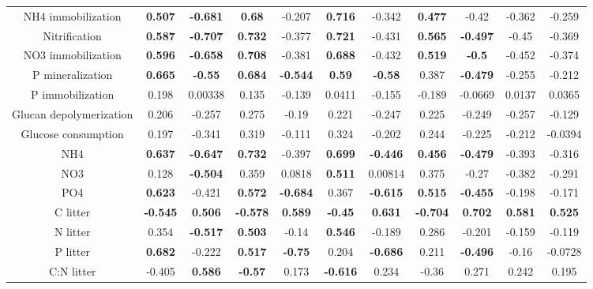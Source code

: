 \documentclass[authoryear,preprint,review,12pt]{elsarticle}
\begin{document}
\begin{table}[h!]
\begin{center}
{\begin{tabular}{ccccccccccc}
  NH4 immobilization & \textbf{ 0.507 } & \textbf{ -0.681 } & \textbf{ 0.68 } & -0.207 & \textbf{ 0.716 } & -0.342 & \textbf{ 0.477 } & -0.42 & -0.362 & -0.259 \\ 
  Nitrification & \textbf{ 0.587 } & \textbf{ -0.707 } & \textbf{ 0.732 } & -0.377 & \textbf{ 0.721 } & -0.431 & \textbf{ 0.565 } & \textbf{ -0.497 } & -0.45 & -0.369 \\ 
  NO3 immobilization & \textbf{ 0.596 } & \textbf{ -0.658 } & \textbf{ 0.708 } & -0.381 & \textbf{ 0.688 } & -0.432 & \textbf{ 0.519 } & \textbf{ -0.5 } & -0.452 & -0.374 \\ 
  P mineralization & \textbf{ 0.665 } & \textbf{ -0.55 } & \textbf{ 0.684 } & \textbf{ -0.544 } & \textbf{ 0.59 } & \textbf{ -0.58 } & 0.387 & \textbf{ -0.479 } & -0.255 & -0.212 \\ 
  P immobilization & 0.198 & 0.00338 & 0.135 & -0.139 & 0.0411 & -0.155 & -0.189 & -0.0669 & 0.0137 & 0.0365 \\ 
  Glucan depolymerization & 0.206 & -0.257 & 0.275 & -0.19 & 0.221 & -0.247 & 0.225 & -0.249 & -0.257 & -0.129 \\ 
  Glucose consumption & 0.197 & -0.341 & 0.319 & -0.111 & 0.324 & -0.202 & 0.244 & -0.225 & -0.212 & -0.0394 \\ 
  NH4 & \textbf{ 0.637 } & \textbf{ -0.647 } & \textbf{ 0.732 } & -0.397 & \textbf{ 0.699 } & \textbf{ -0.446 } & \textbf{ 0.456 } & \textbf{ -0.479 } & -0.393 & -0.316 \\ 
  NO3 & 0.128 & \textbf{ -0.504 } & 0.359 & 0.0818 & \textbf{ 0.511 } & 0.00814 & 0.375 & -0.27 & -0.382 & -0.291 \\ 
  PO4 & \textbf{ 0.623 } & -0.421 & \textbf{ 0.572 } & \textbf{ -0.684 } & 0.367 & \textbf{ -0.615 } & \textbf{ 0.515 } & \textbf{ -0.455 } & -0.198 & -0.171 \\ 
  C litter & \textbf{ -0.545 } & \textbf{ 0.506 } & \textbf{ -0.578 } & \textbf{ 0.589 } & \textbf{ -0.45 } & \textbf{ 0.631 } & \textbf{ -0.704 } & \textbf{ 0.702 } & \textbf{ 0.581 } & \textbf{ 0.525 } \\ 
  N litter & 0.354 & \textbf{ -0.517 } & \textbf{ 0.503 } & -0.14 & \textbf{ 0.546 } & -0.189 & 0.286 & -0.201 & -0.159 & -0.119 \\ 
  P litter & \textbf{ 0.682 } & -0.222 & \textbf{ 0.517 } & \textbf{ -0.75 } & 0.204 & \textbf{ -0.686 } & 0.211 & \textbf{ -0.496 } & -0.16 & -0.0728 \\ 
  C:N litter & -0.405 & \textbf{ 0.586 } & \textbf{ -0.57 } & 0.173 & \textbf{ -0.616 } & 0.234 & -0.36 & 0.271 & 0.242 & 0.195 \\ 

\end{tabular}}
\end{center}
\end{table}
\end{document}
